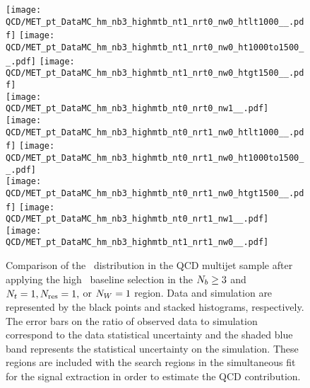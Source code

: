 \begin{figure}[!h]
	\begin{center}
  \texttt{[image: QCD/MET\_pt\_DataMC\_hm\_nb3\_highmtb\_nt1\_nrt0\_nw0\_htlt1000\_\_.pdf]}
  \texttt{[image: QCD/MET\_pt\_DataMC\_hm\_nb3\_highmtb\_nt1\_nrt0\_nw0\_ht1000to1500\_\_.pdf]} 
  \texttt{[image: QCD/MET\_pt\_DataMC\_hm\_nb3\_highmtb\_nt1\_nrt0\_nw0\_htgt1500\_\_.pdf]} \\
  \texttt{[image: QCD/MET\_pt\_DataMC\_hm\_nb3\_highmtb\_nt0\_nrt0\_nw1\_\_.pdf]} 
  \texttt{[image: QCD/MET\_pt\_DataMC\_hm\_nb3\_highmtb\_nt0\_nrt1\_nw0\_htlt1000\_\_.pdf]} 
  \texttt{[image: QCD/MET\_pt\_DataMC\_hm\_nb3\_highmtb\_nt0\_nrt1\_nw0\_ht1000to1500\_\_.pdf]}  \\
  \texttt{[image: QCD/MET\_pt\_DataMC\_hm\_nb3\_highmtb\_nt0\_nrt1\_nw0\_htgt1500\_\_.pdf]} 
  \texttt{[image: QCD/MET\_pt\_DataMC\_hm\_nb3\_highmtb\_nt0\_nrt1\_nw1\_\_.pdf]} 
  \texttt{[image: QCD/MET\_pt\_DataMC\_hm\_nb3\_highmtb\_nt1\_nrt1\_nw0\_\_.pdf]} \\
	\end{center}
	\caption[QCD Multijet HM Control Region $\nb\geq3$ with 1 heavy object]{Comparison of the \met~distribution in the QCD multijet sample after applying the high \dm~baseline selection in the $\nb\geq3$ and $N_{t}=1, N_{\text{res}}=1,$ or $N_{W}=1$ region. Data and simulation are represented by the black points and stacked histograms, respectively. The error bars on the ratio of observed data to simulation correspond to the data statistical uncertainty and the shaded blue band represents the statistical uncertainty on the simulation. These regions are included with the search regions in the simultaneous fit for the signal extraction in order to estimate the QCD contribution.
	 }
	\label{fig:qcd-cr-datavsmc-hm-nb3-1}
\end{figure}
